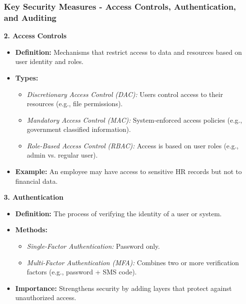 \documentclass{beamer}
\begin{document}
\begin{frame}[fragile]
    \frametitle{Key Security Measures - Access Controls, Authentication, and Auditing}
    \textbf{2. Access Controls}
    \begin{itemize}
        \item \textbf{Definition:} Mechanisms that restrict access to data and resources based on user identity and roles.
        \item \textbf{Types:}
            \begin{itemize}
                \item \textit{Discretionary Access Control (DAC):} Users control access to their resources (e.g., file permissions).
                \item \textit{Mandatory Access Control (MAC):} System-enforced access policies (e.g., government classified information).
                \item \textit{Role-Based Access Control (RBAC):} Access is based on user roles (e.g., admin vs. regular user).
            \end{itemize}
        \item \textbf{Example:} An employee may have access to sensitive HR records but not to financial data.
    \end{itemize}

    \vspace{1em}
    \textbf{3. Authentication}
    \begin{itemize}
        \item \textbf{Definition:} The process of verifying the identity of a user or system.
        \item \textbf{Methods:}
            \begin{itemize}
                \item \textit{Single-Factor Authentication:} Password only.
                \item \textit{Multi-Factor Authentication (MFA):} Combines two or more verification factors (e.g., password + SMS code).
            \end{itemize}
        \item \textbf{Importance:} Strengthens security by adding layers that protect against unauthorized access.
    \end{itemize}
\end{frame}
\end{document}
